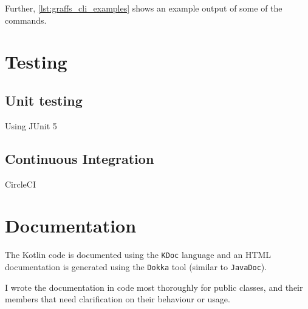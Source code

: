 Further, \autoref{lst:graffs_cli_examples} shows an example output of some of the commands.




\section{Testing}

\subsection{Unit testing}
Using JUnit 5

\subsection{Continuous Integration}
CircleCI


\section{Documentation}

The Kotlin code is documented using the \texttt{KDoc} language and an HTML documentation is generated using the \texttt{Dokka} tool (similar to \texttt{JavaDoc}).\citeneeded

I wrote the documentation in code most thoroughly for public classes, and their members that need clarification on their behaviour or usage.



